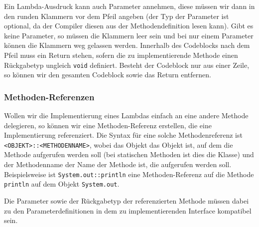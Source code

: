 	Ein Lambda-Ausdruck kann auch Parameter annehmen, diese müssen wir dann in den runden Klammern vor dem Pfeil angeben (der Typ der Parameter ist optional, da der Compiler diesen aus der Methodendefinition lesen kann). Gibt es keine Parameter, so müssen die Klammern leer sein und bei nur einem Parameter können die Klammern weg gelassen werden. Innerhalb des Codeblocks nach dem Pfeil muss ein Return stehen, sofern die zu implementierende Methode einen Rückgabetyp ungleich \lstinline|void| definiert. Besteht der Codeblock nur aus einer Zeile, so können wir den gesamten Codeblock sowie das Return entfernen.
	
	\subsubsection{Methoden-Referenzen}
		Wollen wir die Implementierung eines Lambdas einfach an eine andere Methode delegieren, so können wir eine Methoden-Referenz erstellen, die eine Implementierung referenziert. Die Syntax für eine solche Methodenreferenz ist \lstinline|<OBJEKT>::<METHODENNAME>|, wobei das Objekt das Objekt ist, auf dem die Methode aufgerufen werden soll (bei statischen Methoden ist dies die Klasse) und der Methodenname der Name der Methode ist, die aufgerufen werden soll. Beispielsweise ist \lstinline|System.out::println| eine Methoden-Referenz auf die Methode \lstinline|println| auf dem Objekt \lstinline|System.out|.
		
		Die Parameter sowie der Rückgabetyp der referenzierten Methode müssen dabei zu den Parameterdefinitionen in dem zu implementierenden Interface kompatibel sein.
	
